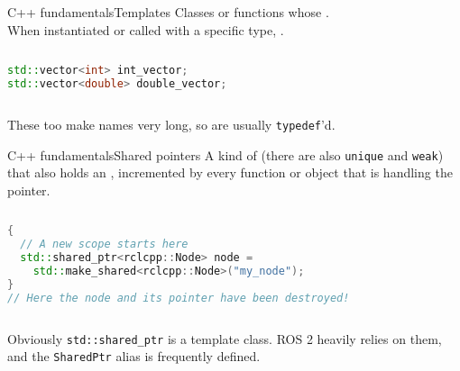 \begin{frame}[fragile]{C++ fundamentals}{Templates}
	Classes or functions whose .\\
  When instantiated or called with a specific type, .
  \vspace{.5cm}
	\begin{columns}
		\begin{lstlisting}[language=C++, caption=Example of objects of the template class \texttt{std::vector}.]
std::vector<int> int_vector;
std::vector<double> double_vector;\end{lstlisting}
	\end{columns}
  \vspace{.5cm}
	These too make names very long, so are usually \texttt{typedef}'d.
\end{frame}
\begin{frame}[fragile]{C++ fundamentals}{Shared pointers}
	A kind of  (there are also \texttt{unique} and \texttt{weak}) that also holds an , incremented by every function or object that is handling the pointer.\\
  \vspace{.1cm}
	\begin{columns}
		\column{.9\textwidth}
		\begin{lstlisting}[language=C++, caption=Example of shared pointer creation.]
{
  // A new scope starts here
  std::shared_ptr<rclcpp::Node> node =
    std::make_shared<rclcpp::Node>("my_node");
}
// Here the node and its pointer have been destroyed!\end{lstlisting}
	\end{columns}
  \vspace{.1cm}
	Obviously \texttt{std::shared\_ptr} is a template class. ROS 2 heavily relies on them, and the \texttt{SharedPtr} alias is frequently defined.
\end{frame}
